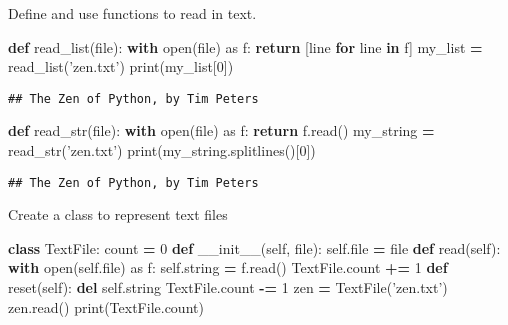 \documentclass[]{article}
\newenvironment{Shaded}{\begin{snugshade}}{\end{snugshade}}
\newcommand{\KeywordTok}[1]{\textcolor[rgb]{0.13,0.29,0.53}{\textbf{#1}}}
\newcommand{\DecValTok}[1]{\textcolor[rgb]{0.00,0.00,0.81}{#1}}
\newcommand{\StringTok}[1]{\textcolor[rgb]{0.31,0.60,0.02}{#1}}
\newcommand{\ImportTok}[1]{#1}
\newcommand{\FunctionTok}[1]{\textcolor[rgb]{0.00,0.00,0.00}{#1}}
\newcommand{\VariableTok}[1]{\textcolor[rgb]{0.00,0.00,0.00}{#1}}
\newcommand{\ControlFlowTok}[1]{\textcolor[rgb]{0.13,0.29,0.53}{\textbf{#1}}}
\newcommand{\OperatorTok}[1]{\textcolor[rgb]{0.81,0.36,0.00}{\textbf{#1}}}
\newcommand{\BuiltInTok}[1]{#1}
\newcommand{\NormalTok}[1]{#1}
\begin{document}
Define and use functions to read in text.

\begin{Shaded}
\begin{Highlighting}[]
\KeywordTok{def}\NormalTok{ read_list(}\BuiltInTok{file}\NormalTok{):}
    \ControlFlowTok{with} \BuiltInTok{open}\NormalTok{(}\BuiltInTok{file}\NormalTok{) }\ImportTok{as}\NormalTok{ f:}
        \ControlFlowTok{return}\NormalTok{ [line }\ControlFlowTok{for}\NormalTok{ line }\KeywordTok{in}\NormalTok{ f]}
\NormalTok{my_list }\OperatorTok{=}\NormalTok{ read_list(}\StringTok{'zen.txt'}\NormalTok{)}
\BuiltInTok{print}\NormalTok{(my_list[}\DecValTok{0}\NormalTok{])}
\end{Highlighting}
\end{Shaded}

\begin{verbatim}
## The Zen of Python, by Tim Peters
\end{verbatim}

\begin{Shaded}
\begin{Highlighting}[]
\KeywordTok{def}\NormalTok{ read_str(}\BuiltInTok{file}\NormalTok{):}
    \ControlFlowTok{with} \BuiltInTok{open}\NormalTok{(}\BuiltInTok{file}\NormalTok{) }\ImportTok{as}\NormalTok{ f:}
        \ControlFlowTok{return}\NormalTok{ f.read()}
\NormalTok{my_string }\OperatorTok{=}\NormalTok{ read_str(}\StringTok{'zen.txt'}\NormalTok{)}
\BuiltInTok{print}\NormalTok{(my_string.splitlines()[}\DecValTok{0}\NormalTok{])}
\end{Highlighting}
\end{Shaded}

\begin{verbatim}
## The Zen of Python, by Tim Peters
\end{verbatim}

Create a class to represent text files

\begin{Shaded}
\begin{Highlighting}[]
\KeywordTok{class}\NormalTok{ TextFile:}
\NormalTok{    count }\OperatorTok{=} \DecValTok{0}
    \KeywordTok{def} \FunctionTok{__init__}\NormalTok{(}\VariableTok{self}\NormalTok{, }\BuiltInTok{file}\NormalTok{):}
        \VariableTok{self}\NormalTok{.}\BuiltInTok{file} \OperatorTok{=} \BuiltInTok{file}
    \KeywordTok{def}\NormalTok{ read(}\VariableTok{self}\NormalTok{):}
        \ControlFlowTok{with} \BuiltInTok{open}\NormalTok{(}\VariableTok{self}\NormalTok{.}\BuiltInTok{file}\NormalTok{) }\ImportTok{as}\NormalTok{ f:}
            \VariableTok{self}\NormalTok{.string }\OperatorTok{=}\NormalTok{ f.read()}
\NormalTok{        TextFile.count }\OperatorTok{+=} \DecValTok{1}
    \KeywordTok{def}\NormalTok{ reset(}\VariableTok{self}\NormalTok{):}
        \KeywordTok{del} \VariableTok{self}\NormalTok{.string}
\NormalTok{        TextFile.count }\OperatorTok{-=} \DecValTok{1}
\NormalTok{zen }\OperatorTok{=}\NormalTok{ TextFile(}\StringTok{'zen.txt'}\NormalTok{)}
\NormalTok{zen.read()}
\BuiltInTok{print}\NormalTok{(TextFile.count)}
\end{Highlighting}
\end{Shaded}
\end{document}

